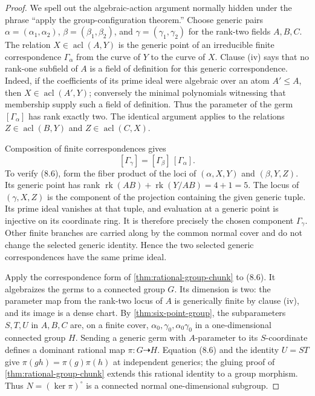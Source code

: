 \documentclass[11pt,oneside]{article}
\theoremstyle{definition}
\theoremstyle{remark}
\newcommand{\acl}{\operatorname{acl}}
\newcommand{\rk}{\operatorname{rk}}
\begin{document}
\begin{proof}
We spell out the algebraic-action argument normally hidden under the phrase ``apply the
group-configuration theorem.''  Choose generic pairs $\alpha=(\alpha_1,\alpha_2)$,
$\beta=(\beta_1,\beta_2)$, and $\gamma=(\gamma_1,\gamma_2)$ for the rank-two fields
$A,B,C$.  The relation $X\in\acl(A,Y)$ is the generic point of an irreducible finite
correspondence $\Gamma_\alpha$ from the curve of $Y$ to the curve of $X$.  Clause (iv)
says that no rank-one subfield of $A$ is a field of definition for this generic
correspondence.  Indeed, if the coefficients of its prime ideal were algebraic over an
atom $A'\leq A$, then $X\in\acl(A',Y)$; conversely the minimal polynomials witnessing
that membership supply such a field of definition.  Thus the parameter of the germ
$[\Gamma_\alpha]$ has rank exactly two.  The identical argument applies to the relations
$Z\in\acl(B,Y)$ and $Z\in\acl(C,X)$.

Composition of finite correspondences gives
\[
 [\Gamma_\gamma]=[\Gamma_\beta]\,[\Gamma_\alpha].              \tag{8.6}
\]
To verify (8.6), form the fiber product of the loci of $(\alpha,X,Y)$ and
$(\beta,Y,Z)$.  Its generic point has rank
$\rk(AB)+\rk(Y/AB)=4+1=5$.  The locus of $(\gamma,X,Z)$ is the component of the
projection containing the given generic tuple.  Its prime ideal vanishes at that tuple,
and evaluation at a
generic point is injective on its coordinate ring.  It is therefore precisely the chosen
component $\Gamma_\gamma$.  Other finite branches are carried along by the common normal
cover and do not change the selected generic identity.  Hence the two selected generic
correspondences have the same prime ideal.

Apply the correspondence form of \cref{thm:rational-group-chunk} to (8.6).  It
algebraizes the germs to a connected group $G$.  Its dimension is two: the parameter
map from the rank-two locus of $A$ is generically finite by clause (iv), and its image is
a dense chart.  By \cref{thm:six-point-group}, the subparameters $S,T,U$ in $A,B,C$
are, on a finite cover, $\alpha_0,\gamma_0,\alpha_0\gamma_0$ in a one-dimensional
connected group $H$.  Sending a generic germ with $A$-parameter to its $S$-coordinate
defines a dominant rational map $\pi:G\dashrightarrow H$.  Equation (8.6) and the
identity $U=ST$ give $\pi(gh)=\pi(g)\pi(h)$ at independent generics; the gluing proof
of \cref{thm:rational-group-chunk} extends this rational identity to a group morphism.
Thus $N=(\ker\pi)^\circ$ is a connected normal one-dimensional subgroup.


\end{proof}
\end{document}
